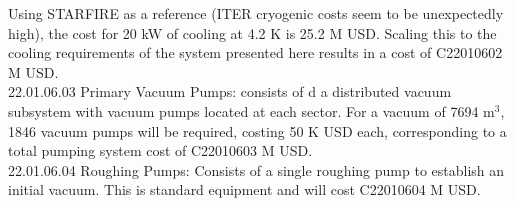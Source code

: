 Using STARFIRE as a reference (ITER cryogenic costs seem to be unexpectedly high), the cost for 20 kW of cooling at 4.2 K is 25.2 M USD. Scaling this to the cooling requirements of the system presented here results in a cost of C22010602 M USD. \\



22.01.06.03 Primary Vacuum Pumps: consists of d a distributed vacuum subsystem with vacuum pumps located at each sector. For a vacuum of 7694 m$^3$, 1846 vacuum pumps will be required, costing 50 K USD each, corresponding to a total pumping system cost of C22010603 M USD.\\

22.01.06.04 Roughing Pumps: Consists of a single roughing pump to establish an initial vacuum. This is standard equipment and will cost C22010604 M USD.


